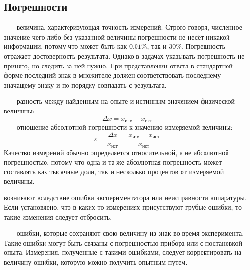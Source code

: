 \subsection{Погрешности}
~--- величина, характеризующая точность измерений. Строго говоря, численное значение чего-либо без указанной величины погрешности не несёт никакой информации, потому что  может быть как $0.01\%$, так и $30\%$. Погрешность отражает достоверность результата. Однако в задачах указывать погрешность не принято, но следить за ней нужно. При представлении ответа в стандартной форме последний знак в множителе должен соответствовать последнему значащему знаку и по порядку совпадать с  результата.

~--- разность между найденным на опыте и истинным значением физической величины:
\begin{equation}
\Delta x = x_\text{изм} - x_\text{ист}
\end{equation}
~--- отношение абсолютной погрешности к значению измеряемой величины:
\begin{equation}
\varepsilon = \frac{\Delta x}{x_\text{ист}} = \frac{x_\text{изм} - x_\text{ист}}{x_\text{ист}}
\end{equation}
Качество измерений обычно определяется относительной, а не абсолютной погрешностью, потому что одна и та же абсолютная погрешность может составлять как тысячные доли, так и несколько процентов от измеряемой величины.

 возникают вследствие ошибки экспериментатора или неисправности аппаратуры. Если установлено, что в каких-то измерениях присутствуют грубые ошибки, то такие изменения следует отбросить.

~--- ошибки, которые сохраняют свою величину из знак во время эксперимента. Такие ошибки могут быть связаны с погрешностью прибора или с постановкой опыта. Измерения, полученные с такими ошибками, следует корректировать на величину ошибки, которую можно получить опытным путем.

